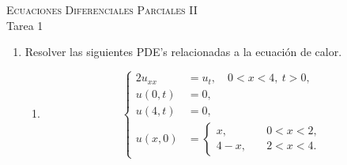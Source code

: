 \documentclass[12pt]{article}
\begin{document}
    \pagestyle{empty}
    \begin{center}
        {\textsc{Ecuaciones Diferenciales Parciales II} \\
        \medskip 
        \large{Tarea 1}}
    \end{center}
    
    \bigskip
    
    \begin{enumerate}
        \item Resolver las siguientes PDE's relacionadas a la ecuación de calor.

        \begin{enumerate}
            \item \[
            \begin{cases}
                2u_{xx} &= u_t,\quad0<x<4,~t>0,\\
                u(0,t) &= 0,\\
                u(4,t) &= 0,\\
                u(x,0) &= \begin{cases}
                    x,\quad   &0<x<2,\\
                    4-x,\quad &2<x<4.
                \end{cases}
            \end{cases}
            \]


\end{enumerate}
\end{enumerate}
\end{document}
